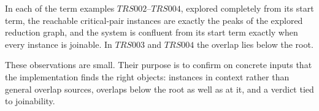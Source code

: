 \begin{observation}
\label{prop:trs-critical-pairs-as-curvature-generators}
In each of the term examples $TRS002$--$TRS004$, explored completely from its start term, the reachable critical-pair instances are exactly the peaks of the explored reduction graph, and the system is confluent from its start term exactly when every instance is joinable. In $TRS003$ and $TRS004$ the overlap lies below the root.
\end{observation}

These observations are small. Their purpose is to confirm on concrete inputs that the implementation finds the right objects: instances in context rather than general overlap sources, overlaps below the root as well as at it, and a verdict tied to joinability.
